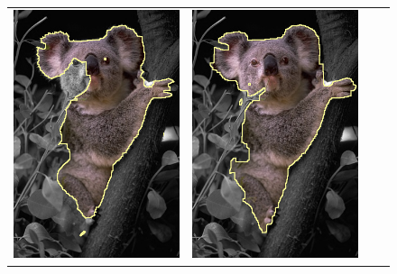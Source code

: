 \begin{figure}
\begin{tabular}{cccc}
 	\includegraphics[scale=0.25]{figures/chapter6/segmentation/coala/mt_improve/radius_5/data_0.50/sq_0.00/length_0.50/it_50/gc-seg.png} & 
 	\includegraphics[scale=0.25]{figures/chapter6/segmentation/coala/mt_improve/radius_5/data_0.50/sq_0.00/length_0.50/it_50/corrected-seg.png} & 

\end{tabular}
\end{figure}
